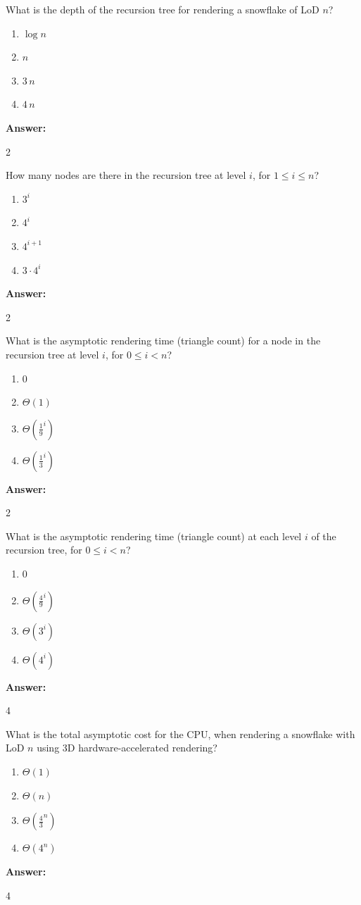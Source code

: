 \documentclass[12pt,twoside]{article}
\newcommand{\answer}{
 \par\medskip
 \textbf{Answer:}
}
\newcommand{\answerIa}{ \answer
2
}
\newcommand{\answerIb}{ \answer
2
}
\newcommand{\answerIc}{ \answer
2
}
\newcommand{\answerId}{ \answer
4
}
\newcommand{\answerIe}{ \answer
4
}
\begin{document}
\begin{problems}
\begin{problemparts}
  \problempart {} What is the depth of the recursion tree for rendering a
  snowflake of LoD $n$?
    \begin{enumerate}
      \item $\log n$
      \item $n$
      \item $3 \, n$
      \item $4 \, n$
    \end{enumerate}
\answerIa

  \problempart {} How many nodes are there in the recursion tree at level
  $i$, for $1 \le i \le n$?
    \begin{enumerate}
     \item $3 ^ i$
      \item $4 ^ i$
      \item $4 ^ {i + 1}$
      \item $3 \cdot 4 ^ i$
    \end{enumerate}
\answerIb
    
  \problempart {} What is the asymptotic rendering time (triangle count) for a
  node in the recursion tree at level $i$, for $0 \le i < n$?
    \begin{enumerate}
      \item $0$
      \item $\Theta(1)$
      \item $\Theta(\frac{1}{9}^i)$
      \item $\Theta(\frac{1}{3}^i)$
    \end{enumerate}
\answerIc 

  \problempart {} What is the asymptotic rendering time (triangle count) at
  each level $i$ of the recursion tree, for $0 \le i < n$?
    \begin{enumerate}
      \item 0
      \item $\Theta(\frac{4}{9} ^ i)$
      \item $\Theta(3 ^ i)$
      \item $\Theta(4 ^ i)$
    \end{enumerate}
\answerId

  \problempart {} What is the total asymptotic cost for the CPU, when rendering
  a snowflake with LoD $n$ using 3D hardware-accelerated rendering?
    \begin{enumerate}
      \item $\Theta(1)$
      \item $\Theta(n)$
      \item $\Theta(\frac{4}{3}^n)$
      \item $\Theta(4^n)$
    \end{enumerate}
\answerIe
\end{problemparts}


\end{problems}
\end{document}

